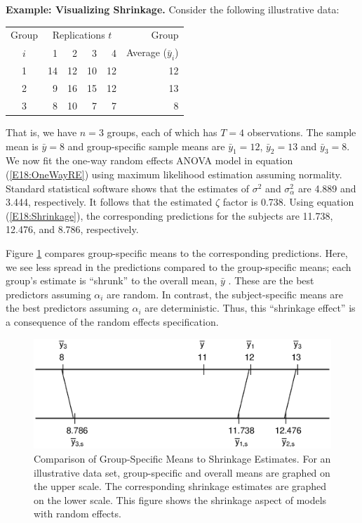 \textbf{ Example: Visualizing Shrinkage.} Consider the following
illustrative data:
\begin{center}
\begin{tabular}{crrrrr}
  \hline
Group & \multicolumn{4}{c}{Replications $t$} & Group \\
$i$& 1  & 2  & 3  & 4  & Average ($\bar{y}_i$)\\ \hline
1  & 14 & 12 & 10 & 12 & 12 \\
2  & 9  & 16 & 15 & 12 & 13 \\
3  & 8  & 10 & 7  & 7  & 8 \\
  \hline
\end{tabular}\end{center}
That is, we have $n=3$ groups, each of which has $T=4$ observations.
The sample mean is $\bar{y} = 8$ and group-specific sample means are
$\bar{y}_1=12$, $\bar{y}_2=13$ and $\bar{y}_3=8$. We now fit the
one-way random effects ANOVA model in equation (\ref{E18:OneWayRE})
using maximum likelihood estimation assuming normality. Standard
statistical software shows that the estimates of $\sigma^2$ and
$\sigma^2_{\alpha}$ are 4.889 and 3.444, respectively. It follows
that the estimated $\zeta$ factor is 0.738. Using equation
(\ref{E18:Shrinkage}), the corresponding predictions for the
subjects are 11.738, 12.476, and 8.786, respectively.

Figure \ref{F18:Shrinkage} compares group-specific means to the
corresponding predictions. Here, we see less spread in the
predictions compared to the group-specific means; each group's
estimate is ``shrunk'' to the overall mean, $\bar{y}$ . These are
the best predictors assuming $\alpha_i$ are random. In contrast, the
subject-specific means are the best predictors assuming $\alpha_i$
are deterministic. Thus, this ``shrinkage effect'' is a consequence
of the random effects specification.

\begin{figure}[htp]
  \begin{center}
    \includegraphics[width=1\textwidth]{Chapter18CredibilityBM/F18Shrinkage.eps}
    \caption{\label{F18:Shrinkage} \small  Comparison of Group-Specific Means to Shrinkage Estimates.
For an illustrative data set, group-specific and overall means are
graphed on the upper scale. The corresponding shrinkage estimates
are graphed on the lower scale. This figure shows the shrinkage
aspect of models with random effects. }
  \end{center}
\end{figure}

